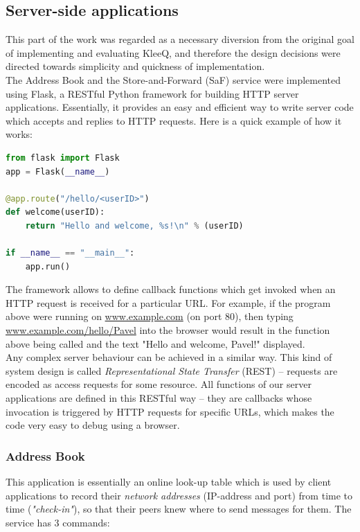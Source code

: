 \documentclass[a4paper, 12pt]{report}
\begin{document}
\subsection{Server-side applications}
This part of the work was regarded as a necessary diversion from the original goal of implementing and evaluating KleeQ, and therefore the design decisions were directed towards simplicity and quickness of implementation. \\

The Address Book and the Store-and-Forward (SaF) service were implemented using Flask, a RESTful Python framework for building HTTP server applications. Essentially, it provides an easy and efficient way to write server code which accepts and replies to HTTP requests. Here is a quick example of how it works: \\

\begin{lstlisting}[language = Python, columns=fullflexible]
from flask import Flask
app = Flask(__name__)

@app.route("/hello/<userID>")
def welcome(userID):
    return "Hello and welcome, %s!\n" % (userID)
    
if __name__ == "__main__":
    app.run()
\end{lstlisting}


The framework allows to define callback functions which get invoked when an HTTP request is received for a particular URL. For example, if the program above were running on \url{www.example.com} (on port 80), then typing \url{www.example.com/hello/Pavel} into the browser would result in the function above being called and the text "Hello and welcome, Pavel!" displayed. \\

Any complex server behaviour can be achieved in a similar way. This kind of system design is called \emph{Representational State Transfer} (REST) -- requests are encoded as access requests for some resource.  All functions of our server applications are defined in this RESTful way -- they are callbacks whose invocation is triggered by HTTP requests for specific URLs, which makes the code very easy to debug using a browser.

\subsubsection{Address Book}
This application is essentially an online look-up table which is used by client applications to record their \emph{network addresses} (IP-address and port) from time to time (\emph{"check-in"}), so that their peers knew where to send messages for them. The service has 3 commands:
\end{document}

